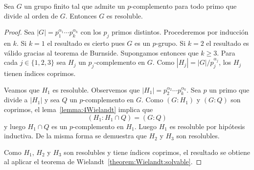 \begin{theorem}[Hall]
	\label{theorem:Hall:solvable}
	Sea $G$ un grupo finito tal que admite un $p$-complemento para todo primo
	que divide al orden de $G$. Entonces $G$ es resoluble.
\end{theorem}

\begin{proof}
	Sea $|G|=p_1^{\alpha_1}\cdots
	p_k^{\alpha_k}$ con los $p_j$ primos distintos. Procederemos por inducción
	en $k$. Si $k=1$ el resultado es cierto pues $G$ es un $p$-grupo. Si $k=2$
	el resultado es válido gracias al teorema de Burnside. Supongamos entonces
	que $k\geq3$. Para cada $j\in\{1,2,3\}$ sea $H_j$ un $p_j$-complemento en
	$G$. Como $|H_j|=|G|/p_j^{\alpha_j}$, los $H_j$ tienen índices coprimos.

	Veamos que $H_1$ es resoluble. Observemos que $|H_1|=p_2^{\alpha_2}\cdots
	p_k^{\alpha_k}$. Sea $p$ un primo que divide a $|H_1|$ y sea $Q$ un
	$p$-complemento en $G$. 
	Como $(G:H_1)$ y $(G:Q)$ son
	coprimos, el lema~\ref{lemma:4Wielandt} implica que 
	\[
	(H_1:H_1\cap Q)=(G:Q)
	\]
	y luego $H_1\cap Q$ es un $p$-complemento en $H_1$.  Luego $H_1$ es
	resoluble por hipótesis inductiva. De la misma forma se demuestra que $H_2$
	y $H_3$ son resolubles.

	Como $H_1$, $H_2$ y $H_3$ son resolubles y tiene índices coprimos, el
	resultado se obtiene al aplicar el teorema de
	Wielandt~\ref{theorem:Wielandt:solvable}.
\end{proof}
